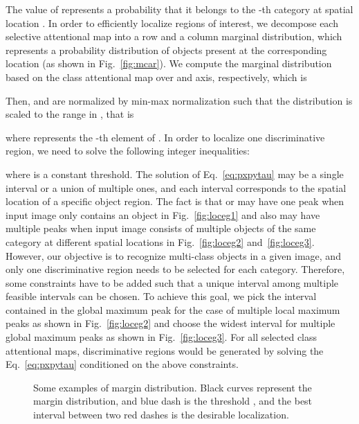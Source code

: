 \documentclass[journal]{IEEEtran}
\begin{document}
The value of  represents a probability that it belongs to the -th category at spatial location . 
In order to efficiently localize regions of interest, we decompose each selective attentional map  into a row and a column marginal distribution, which represents a probability distribution of objects present at the corresponding location (as shown in Fig.~\ref{fig:mcar}). We compute the marginal distribution based on the class attentional map  over  and  axis, respectively, which is
 
 Then,  and  are normalized by min-max normalization such that the distribution is scaled to the range in  , that is
 
where  represents the -th element of . In order to localize one discriminative region, we need to solve the following integer inequalities:
 
where  is a constant threshold. The solution of Eq.~\ref{eq:pxpytau} may be a single interval or a union of multiple ones, and each interval corresponds to the spatial location of a specific object region. The fact is that  or  may have one peak when input image only contains an object in Fig.~\ref{fig:loceg1} and also may have multiple peaks when input image consists of multiple objects of the same category at different spatial locations in Fig.~\ref{fig:loceg2} and~\ref{fig:loceg3}. However, our objective is to recognize multi-class objects in a given image, and only one discriminative region needs to be selected for each category. Therefore, some constraints have to be added such that a unique interval among multiple feasible intervals can be chosen. To achieve this goal, we pick the interval contained in the global maximum peak for the case of multiple local maximum peaks as shown in Fig.~\ref{fig:loceg2} and choose the widest interval for multiple global maximum peaks as shown in Fig.~\ref{fig:loceg3}. For all selected  class attentional maps,  discriminative regions would be generated by solving the Eq.~\ref{eq:pxpytau} conditioned on the above constraints.

\begin{figure}[t]
 \centering
  \hspace{15pt}
 \hspace{15pt}
\caption{Some examples of margin distribution. Black curves represent the margin distribution, and blue dash is the threshold , and the best interval between two red dashes is the desirable localization. } \label{fig:loceg}
\end{figure}
\end{document}
